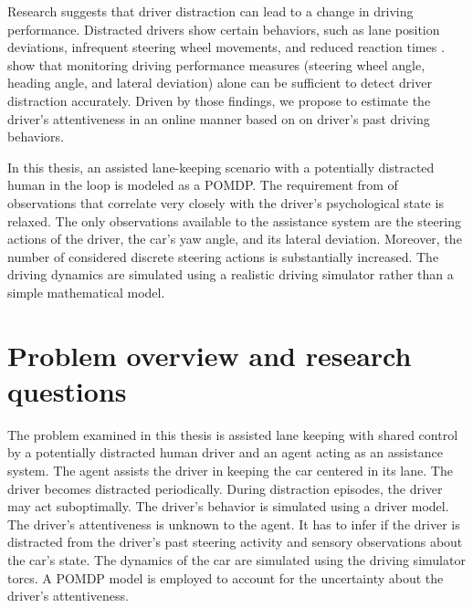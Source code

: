 Research suggests that driver distraction can lead to a change in driving performance. Distracted drivers show certain behaviors, such as lane position deviations, infrequent steering wheel movements, and reduced reaction times \parencite{driver-distraction-review}. \cite{dist-det-perf} show that monitoring driving performance measures (steering wheel angle, heading angle, and lateral deviation) alone can be sufficient to detect driver distraction accurately. Driven by those findings, we propose to estimate the driver's attentiveness in an online manner based on on driver's past driving behaviors.

In this thesis, an assisted lane-keeping scenario with a potentially distracted human in the loop is modeled as a POMDP. The requirement from \cite{hitl_pomdp} of observations that correlate very closely with the driver's psychological state is relaxed. The only observations available to the assistance system are the steering actions of the driver, the car's yaw angle, and its lateral deviation. Moreover, the number of considered discrete steering actions is substantially increased. The driving dynamics are simulated using a realistic driving simulator rather than a simple mathematical model.

\section{Problem overview and research questions}

The problem examined in this thesis is assisted lane keeping with shared control by a potentially distracted human driver and an agent acting as an assistance system. The agent assists the driver in keeping the car centered in its lane. The driver becomes distracted periodically. During distraction episodes, the driver may act suboptimally. The driver's behavior is simulated using a driver model. The driver’s attentiveness is unknown to the agent. It has to infer if the driver is distracted from the driver's past steering activity and sensory observations about the car's state. The dynamics of the car are simulated using the driving simulator \Gls{torcs}. A POMDP model is employed to account for the uncertainty about the driver's attentiveness.

